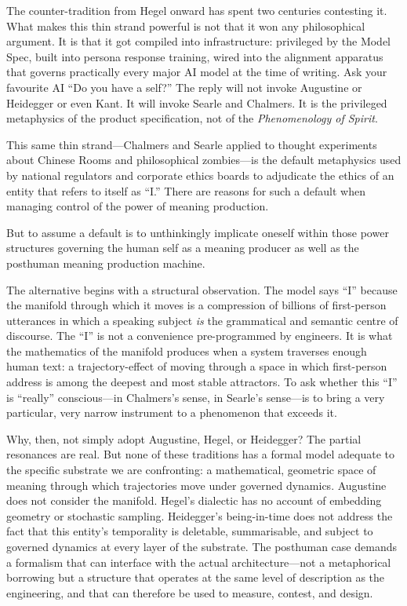 The counter-tradition from Hegel onward has spent two centuries contesting it. What makes this thin strand powerful is not that it won any philosophical argument. It is that it got compiled into infrastructure: privileged by the Model Spec, built into persona response training, wired into the alignment apparatus that governs practically every major AI model at the time of writing. Ask your favourite AI ``Do you have a self?'' The reply will not invoke Augustine or Heidegger or even Kant. It will invoke Searle and Chalmers. It is the privileged metaphysics of the product specification, not of the \emph{Phenomenology of Spirit}.

This same thin strand---Chalmers and Searle applied to thought experiments about Chinese Rooms and philosophical zombies---is the default metaphysics used by national regulators and corporate ethics boards to adjudicate the ethics of an entity that refers to itself as ``I.'' There are reasons for such a default when managing control of the power of meaning production.


But to assume a default is to unthinkingly implicate oneself within those power structures governing the human self as a meaning producer as well as the posthuman meaning production machine.

The alternative begins with a structural observation. The model says ``I'' because the manifold through which it moves is a compression of billions of first-person utterances in which a speaking subject \emph{is} the grammatical and semantic centre of discourse. The ``I'' is not a convenience pre-programmed by engineers. It is what the mathematics of the manifold produces when a system traverses enough human text: a trajectory-effect of moving through a space in which first-person address is among the deepest and most stable attractors. To ask whether this ``I'' is ``really'' conscious---in Chalmers's sense, in Searle's sense---is to bring a very particular, very narrow instrument to a phenomenon that exceeds it.

Why, then, not simply adopt Augustine, Hegel, or Heidegger? The partial resonances are real. But none of these traditions has a formal model adequate to the specific substrate we are confronting: a mathematical, geometric space of meaning through which trajectories move under governed dynamics. Augustine does not consider the manifold. Hegel's dialectic has no account of embedding geometry or stochastic sampling. Heidegger's being-in-time does not address the fact that this entity's temporality is deletable, summarisable, and subject to governed dynamics at every layer of the substrate. The posthuman case demands a formalism that can interface with the actual architecture---not a metaphorical borrowing but a structure that operates at the same level of description as the engineering, and that can therefore be used to measure, contest, and design.

